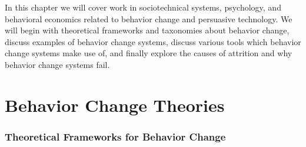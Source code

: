 


In this chapter we will cover work in sociotechnical systems, psychology, and behavioral economics related to behavior change and persuasive technology. We will begin with theoretical frameworks and taxonomies about behavior change, discuss examples of behavior change systems, discuss various tools which behavior change systems make use of, and finally explore the causes of attrition and why behavior change systems fail.

\section{Behavior Change Theories}

\subsubsection{Theoretical Frameworks for Behavior Change}

